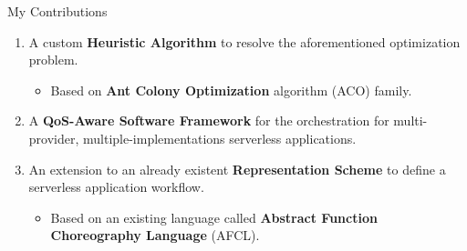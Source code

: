 \documentclass[13.5pt]{beamer}
\newcommand{\B}[1]{\textcolor{TorVergataColor}{\textbf{#1}}}
\begin{document}

\begin{frame}{My Contributions}
	
	\vspace{\baselineskip}
	\begin{enumerate}
		\justifying
		\setcounter{enumi}{2}
		\item A custom \B{Heuristic Algorithm} to resolve the aforementioned optimization problem.
		\begin{itemize}
			\item Based on \B{Ant Colony Optimization} algorithm (ACO) family.
		\end{itemize}
		\vspace{\baselineskip} 
		\item A \B{QoS-Aware Software Framework} for the orchestration for multi-provider, multiple-implementations serverless applications. 
		
		\vspace{\baselineskip} 
		\item An extension to an already existent \B{Representation Scheme} to define a serverless application workflow.
		\begin{itemize}
			\item Based on an existing language called \B{Abstract Function Choreography Language} (AFCL).
		\end{itemize}
		
	\end{enumerate}
	
\end{frame} 

\end{document}
